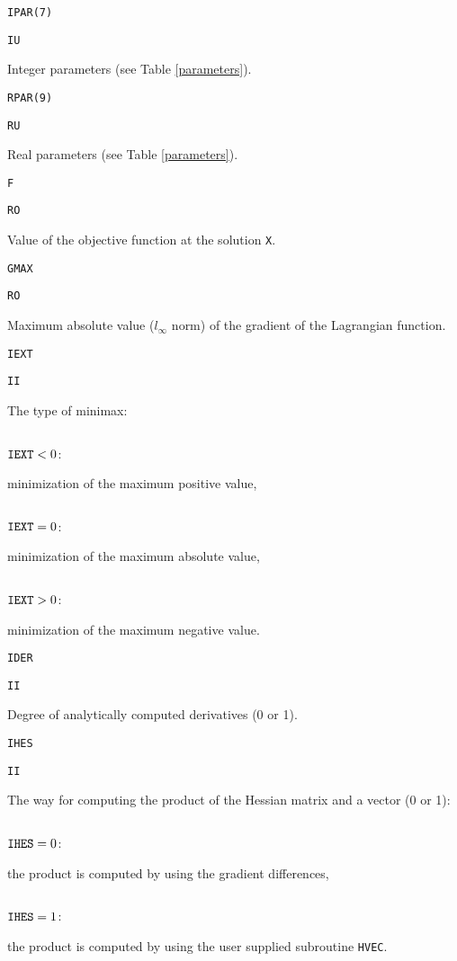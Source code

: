 \documentclass{esub2acm}
\begin{document}
\noindent\parbox{20mm}{\tt IPAR(7)}\parbox{10mm}{\tt IU}\parbox[t]{125mm}{
  Integer parameters (see Table \ref{parameters}).}
  \par\vspace{2mm}
\noindent\parbox{20mm}{\tt RPAR(9)}\parbox{10mm}{\tt RU}\parbox[t]{125mm}{
  Real parameters (see Table \ref{parameters}).}
  \par\vspace{2mm}
\noindent\parbox{20mm}{\tt F}\parbox{10mm}{\tt RO}\parbox[t]{125mm}{
  Value of the objective function at the solution {\tt X}.}
  \par\vspace{2mm}
\noindent\parbox{20mm}{\tt GMAX}\parbox{10mm}{\tt RO}\parbox[t]{125mm}{
  Maximum absolute value ($l_{\infty}$ norm) of the gradient of the
  Lagrangian function.}
  \par\vspace{2mm}
\noindent\parbox{20mm}{\tt IEXT}\parbox{10mm}{\tt II}\parbox[t]{125mm}{
  The type of minimax:}
  \par\vspace{1mm}
\noindent\parbox{30mm}{$\;$}\parbox{24mm}{${\tt IEXT}<0$:}\parbox[t]{101mm}{
  minimization of the maximum positive value,}
  \par
\noindent\parbox{30mm}{$\;$}\parbox{24mm}{${\tt IEXT}=0$:}\parbox[t]{101mm}{
  minimization of the maximum absolute value,}
  \par
\noindent\parbox{30mm}{$\;$}\parbox{24mm}{${\tt IEXT}>0$:}\parbox[t]{101mm}{
  minimization of the maximum negative value.}
  \par\vspace{2mm}
\noindent\parbox{20mm}{\tt IDER}\parbox{10mm}{\tt II}\parbox[t]{125mm}{
  Degree of analytically computed derivatives (0 or 1).}
  \par\vspace{2mm}
\noindent\parbox{20mm}{\tt IHES}\parbox{10mm}{\tt II}\parbox[t]{125mm}{
  The way for computing the product of the Hessian matrix and a vector (0 or 1):}
  \par\vspace{1mm}
\noindent\parbox{30mm}{$\;$}\parbox{24mm}{${\tt IHES}=0$:}\parbox[t]{101mm}{
  the product is computed by using the gradient differences,}
  \par
\noindent\parbox{30mm}{$\;$}\parbox{24mm}{${\tt IHES}=1$:}\parbox[t]{101mm}{
  the product is computed by using the user supplied subroutine {\tt HVEC}.}
  \par\vspace{2mm}
\end{document}
